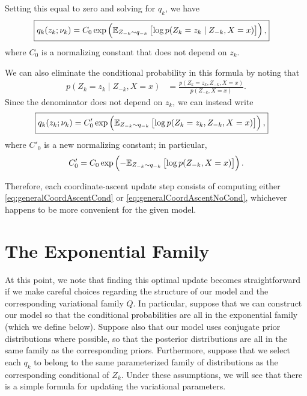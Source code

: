 \documentclass[11pt]{article}
\begin{document}
Setting this equal to zero and solving for $q_k$, we have
\begin{align}
\label{eq:generalCoordAscentCond}
\Aboxed{
q_k(z_k; \nu_k)
&= C_0 \exp \left( \expectOver{Z_{-k} \sim q_{-k}}{ \log p(Z_k = z_k \mid Z_{-k}, X = x) } \right),
}
\end{align}
where $C_0$ is a normalizing constant that does not depend on $z_k$.

We can also eliminate the conditional probability in this formula by noting that
\begin{align}
p(Z_k = z_k \mid Z_{-k}, X = x)
&= \frac{p(Z_k = z_k, Z_{-k}, X = x)}{p(Z_{-k}, X = x)}.
\end{align}
Since the denominator does not depend on $z_k$, we can instead write
\begin{align}
\label{eq:generalCoordAscentNoCond}
\Aboxed{
q_k(z_k; \nu_k)
&= C'_0 \exp \left( \expectOver{Z_{-k} \sim q_{-k}}{ \log p(Z_k = z_k, Z_{-k}, X = x) } \right),
}
\end{align}
where $C'_0$ is a new normalizing constant; in particular,
\begin{align}
C'_0 = C_0 \exp \left( -\mathbb{E}_{\substack{Z_{-k} \sim q_{-k}}}\left[  \log p(Z_{-k}, X = x)  \right]\right).
\end{align}

Therefore, each coordinate-ascent update step consists of computing either \eqref{eq:generalCoordAscentCond} or \eqref{eq:generalCoordAscentNoCond}, whichever happens to be more convenient for the given model.

\section{The Exponential Family}

At this point, we note that finding this optimal update becomes straightforward if we make careful choices regarding the structure of our model and the corresponding variational family $Q$.
In particular, suppose that we can construct our model so that the conditional probabilities are all in the exponential family (which we define below).
Suppose also that our model uses conjugate prior distributions where possible, so that the posterior distributions are all in the same family as the corresponding priors.
Furthermore, suppose that we select each $q_k$ to belong to the same parameterized family of distributions as the corresponding conditional of $Z_k$.
Under these assumptions, we will see that there is a simple formula for updating the variational parameters.
\end{document}
